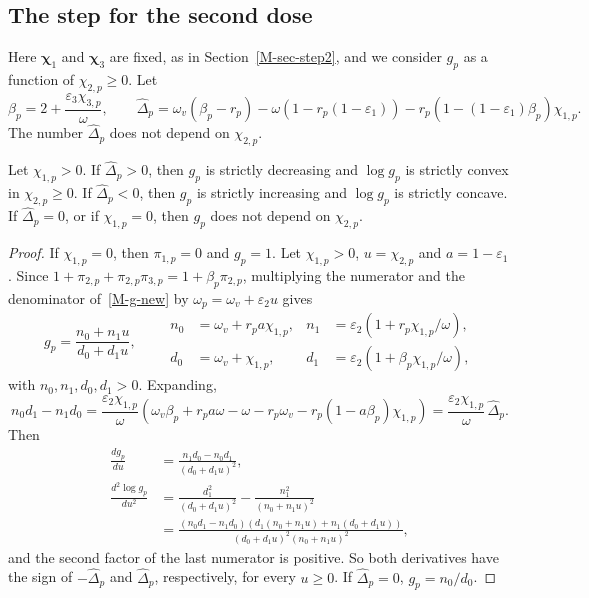 \subsection{The step for the second dose}\label{app-second}

Here $\bm\chi_1$ and $\bm\chi_3$ are fixed, as in Section~\ref{M-sec-step2}, and
we consider $g_p$ as a function of $\chi_{2,p}\ge 0$. Let
\begin{equation}\label{beta-delta}
\beta_p=2+\frac{\varepsilon_3\chi_{3,p}}{\omega},\qquad
\widehat\Delta_p=\omega_v\left(\beta_p-r_p\right)-\omega\left(1-r_p(1-\varepsilon_1)\right)
-r_p\left(1-(1-\varepsilon_1)\beta_p\right)\chi_{1,p}.
\end{equation}
The number $\widehat\Delta_p$ does not depend on $\chi_{2,p}$.

\begin{lemma}\label{g-chi2}
Let $\chi_{1,p}>0$. If $\widehat\Delta_p>0$, then $g_p$ is strictly decreasing and
$\log g_p$ is strictly convex in $\chi_{2,p}\ge 0$. If $\widehat\Delta_p<0$, then $g_p$ is
strictly increasing and $\log g_p$ is strictly concave. If $\widehat\Delta_p=0$, or if
$\chi_{1,p}=0$, then $g_p$ does not depend on $\chi_{2,p}$.
\end{lemma}
\begin{proof}
If $\chi_{1,p}=0$, then $\pi_{1,p}=0$ and $g_p=1$. Let $\chi_{1,p}>0$, $u=\chi_{2,p}$
and $a=1-\varepsilon_1$. Since $1+\pi_{2,p}+\pi_{2,p}\pi_{3,p}=1+\beta_p\pi_{2,p}$,
multiplying the numerator and the denominator of~\eqref{M-g-new} by
$\omega_p=\omega_v+\varepsilon_2u$ gives
\begin{equation*}
g_p=\frac{n_0+n_1u}{d_0+d_1u},\qquad
\begin{aligned}
n_0&=\omega_v+r_pa\chi_{1,p}, & n_1&=\varepsilon_2\left(1+r_p\chi_{1,p}/\omega\right),\\
d_0&=\omega_v+\chi_{1,p}, & d_1&=\varepsilon_2\left(1+\beta_p\chi_{1,p}/\omega\right),
\end{aligned}
\end{equation*}
with $n_0,n_1,d_0,d_1>0$. Expanding,
\begin{equation*}
n_0d_1-n_1d_0=\frac{\varepsilon_2\chi_{1,p}}{\omega}\left(\omega_v\beta_p+r_pa\omega-\omega-r_p\omega_v
-r_p\left(1-a\beta_p\right)\chi_{1,p}\right)=\frac{\varepsilon_2\chi_{1,p}}{\omega}\,\widehat\Delta_p .
\end{equation*}
Then
\begin{equation*}
\begin{aligned}
\frac{dg_p}{du}&=\frac{n_1d_0-n_0d_1}{(d_0+d_1u)^2},\\
\frac{d^2\log g_p}{du^2}&=\frac{d_1^2}{(d_0+d_1u)^2}-\frac{n_1^2}{(n_0+n_1u)^2}\\
&=\frac{\left(n_0d_1-n_1d_0\right)\left(d_1(n_0+n_1u)+n_1(d_0+d_1u)\right)}{(d_0+d_1u)^2(n_0+n_1u)^2},
\end{aligned}
\end{equation*}
and the second factor of the last numerator is positive. So both derivatives
have the sign of $-\widehat\Delta_p$ and $\widehat\Delta_p$, respectively, for every $u\ge 0$.
If $\widehat\Delta_p=0$, $g_p=n_0/d_0$.
\end{proof}

